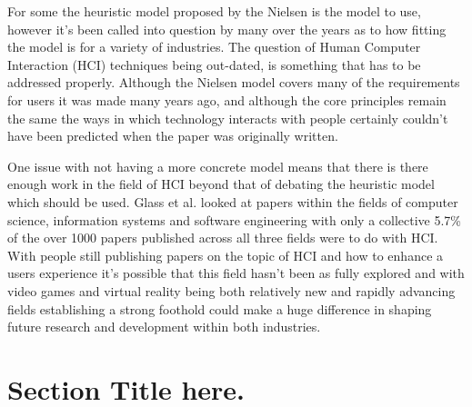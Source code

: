 \documentclass{scrartcl}
\begin{document}
For some the heuristic model proposed by the Nielsen \cite{nielsen1990heuristic} is the model to use, however it's been called into question by many over the years as to how fitting the model is for a variety of industries. \cite{pinelle2008heuristic, pinelle2009usability, sutcliffe2004heuristic, john1998traditional} The question of Human Computer Interaction (HCI) techniques being out-dated, is something that has to be addressed properly. Although the Nielsen model covers many of the requirements for users it was made many years ago, and although the core principles remain the same the ways in which technology interacts with people certainly couldn't have been predicted when the paper was originally written. 

One issue with not having a more concrete model means that there is there enough work in the field of HCI beyond that of debating the heuristic model which should be used. Glass et al. \cite{glass2004analysis} looked at papers within the fields of computer science, information systems and software engineering with only a collective 5.7\% of the over 1000 papers published across all three fields were to do with HCI. With people still publishing papers on the topic of HCI and how to enhance a users experience it's possible that this field hasn't been as fully explored and with video games and virtual reality being both relatively new and rapidly advancing fields establishing a strong foothold could make a huge difference in shaping future research and development within both industries.

\section{Section Title here.}



\end{document}
